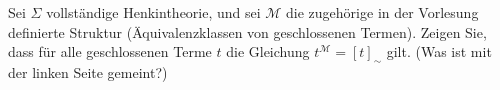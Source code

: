 
\begin{exercise}[118]

Sei $\Sigma$ vollständige Henkintheorie, und sei $\mathscr{M}$ die zugehörige
in der Vorlesung definierte Struktur (Äquivalenzklassen von geschlossenen Termen).
Zeigen Sie, dass für alle geschlossenen Terme $t$ die Gleichung $t^{\mathscr{M}} = [t]_{\sim}$
gilt. (Was ist mit der linken Seite gemeint?)

\end{exercise}


\begin{solution}

\phantom{}

\end{solution}

